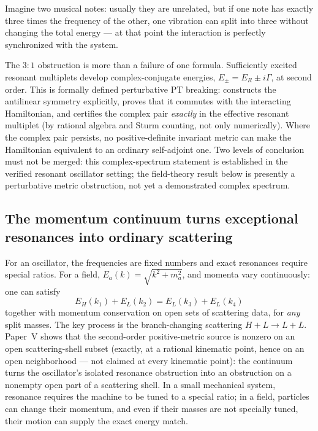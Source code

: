 \documentclass[11pt]{article}
\theoremstyle{remark}
\begin{document}
Imagine two musical notes: usually they are
unrelated, but if one note has exactly three times the frequency of the
other, one vibration can split into three without changing the total
energy --- at that point the interaction is perfectly synchronized with
the system.

The $3{:}1$ obstruction is more than a failure of one formula.
Sufficiently excited resonant multiplets develop complex-conjugate
energies, $E_\pm=E_R\pm i\Gamma$, at second order.  This is formally
defined perturbative PT breaking: \cite{paperV} constructs the
antilinear symmetry explicitly, proves that it commutes with the
interacting Hamiltonian, and certifies the complex pair \emph{exactly}
in the effective resonant multiplet (by rational algebra and Sturm
counting, not only numerically).  Where the complex pair persists, no
positive-definite invariant metric can make the Hamiltonian equivalent
to an ordinary self-adjoint one.  Two levels of conclusion must not be merged: this
complex-spectrum statement is established in the verified resonant
oscillator setting; the field-theory result below is presently a
perturbative metric obstruction, not yet a demonstrated complex
spectrum.

\subsection{The momentum continuum turns exceptional resonances into
ordinary scattering}

For an oscillator, the frequencies are fixed numbers and exact
resonances require special ratios.  For a field,
$E_a(k)=\sqrt{k^2+m_a^2}$, and momenta vary continuously: one can
satisfy
\begin{equation}
E_H(k_1)+E_L(k_2)=E_L(k_3)+E_L(k_4)
\end{equation}
together with momentum conservation on open sets of scattering data,
for \emph{any} split masses.  The key process is the branch-changing
scattering $H+L\to L+L$.  Paper~V shows that the second-order
positive-metric source is nonzero on an open scattering-shell subset
(exactly, at a rational kinematic point, hence on an open neighborhood
--- not claimed at every kinematic point): the continuum turns the
oscillator's isolated resonance obstruction into an obstruction on a
nonempty open part of a scattering shell.  In a small mechanical system,
resonance requires the machine to be tuned to a special ratio; in a
field, particles can change their momentum, and even if their masses
are not specially tuned, their motion can supply the exact energy
match.
\end{document}
